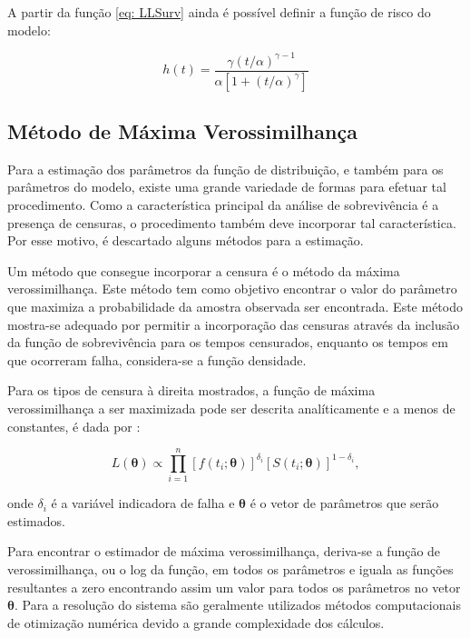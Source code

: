 \documentclass[a4paper,12pt]{article}
\begin{document}
A partir da função \ref{eq: LLSurv} ainda é possível definir a função de risco do modelo:

\begin{equation} \label{eq: hazLL}
h(t) = \dfrac{\gamma(t/\alpha)^{\gamma-1}}{\alpha[1+(t/\alpha)^\gamma]}
\end{equation}


\subsection{Método de Máxima Verossimilhança}

Para a estimação dos parâmetros da função de distribuição, e também para os parâmetros do modelo, existe uma grande variedade de formas para efetuar tal procedimento. Como a característica principal da análise de sobrevivência é a presença de censuras, o procedimento também deve incorporar tal característica. Por esse motivo, é descartado alguns métodos para a estimação.

Um método que consegue incorporar a censura é o método da máxima verossimilhança. Este método tem como objetivo encontrar o valor do parâmetro que maximiza a probabilidade da amostra observada ser encontrada. Este método mostra-se adequado por permitir a incorporação das censuras através da inclusão da função de sobrevivência para os tempos censurados, enquanto os tempos em que ocorreram falha, considera-se a função densidade.

Para os tipos de censura à direita mostrados, a função de máxima verossimilhança a ser maximizada pode ser descrita analíticamente e a menos de constantes, é dada por \cite{colosimo}:

\begin{equation} \label{eq:maxv1}
  L(\boldsymbol{\theta}) \propto \prod_{i=1}^n \left[f(t_i;\boldsymbol{\theta})\right]^{\delta_i} \left[S(t_i;\boldsymbol{\theta})\right]^{1-\delta_i},
\end{equation}

onde $\delta_i$ é a variável indicadora de falha e $\boldsymbol{\theta}$ é o vetor de parâmetros que serão estimados.

Para encontrar o estimador de máxima verossimilhança, deriva-se a função de verossimilhança, ou o log da função, em todos os parâmetros e iguala as funções resultantes a zero encontrando assim um valor para todos os parâmetros no vetor $\boldsymbol{\theta}$. Para a resolução do sistema são geralmente utilizados métodos computacionais de otimização numérica devido a grande complexidade dos cálculos. 
\end{document}

